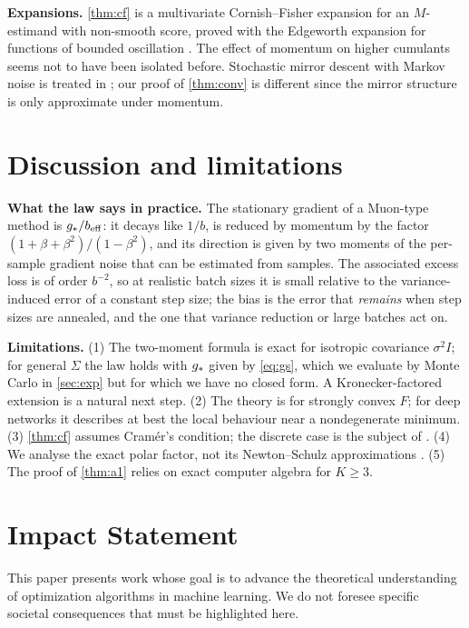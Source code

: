 \documentclass{article}
\theoremstyle{plain}
\theoremstyle{definition}
\theoremstyle{remark}
\begin{document}
\textbf{Expansions.} \cref{thm:cf} is a multivariate Cornish--Fisher expansion \citep{cornish1938moments} for an
$M$-estimand with non-smooth score, proved with the Edgeworth expansion for functions of bounded oscillation
\citep[Thm.~20.1]{br}. The effect of momentum on higher cumulants seems not to have been isolated before.
Stochastic mirror descent with Markov noise is treated in \citet{duchiemd}; our proof of \cref{thm:conv} is different
since the mirror structure is only approximate under momentum.

\section{Discussion and limitations}\label{sec:disc}

\textbf{What the law says in practice.} The stationary gradient of a Muon-type method is $g_\ast/b_{\mathrm{eff}}$: it decays like
$1/b$, is reduced by momentum by the factor $(1+\beta+\beta^2)/(1-\beta^2)$, and its direction is given by two moments
of the per-sample gradient noise that can be estimated from samples. The associated excess loss is of order
$b^{-2}$, so at realistic batch sizes it is small relative to the variance-induced error of a constant step size; the
bias is the error that \emph{remains} when step sizes are annealed, and the one that variance reduction or large
batches act on.

\textbf{Limitations.} (1) The two-moment formula is exact for isotropic covariance $\sigma^2I$; for general $\Sigma$
the law holds with $g_\ast$ given by \eqref{eq:gs}, which we evaluate by Monte Carlo in \cref{sec:exp} but for which we
have no closed form. A Kronecker-factored extension is a natural next step. (2) The theory is for strongly convex
$F$; for deep networks it describes at best the local behaviour near a nondegenerate minimum. (3) \cref{thm:cf} assumes
Cram\'er's condition; the discrete case is the subject of \citet{companionII}. (4) We analyse the exact polar factor,
not its Newton--Schulz approximations \citep{do2026muon,shulgin2026quadratic}. (5) The proof of \cref{thm:a1} relies on exact
computer algebra for $K\ge3$.

\section*{Impact Statement}
This paper presents work whose goal is to advance the theoretical understanding of optimization algorithms in machine
learning. We do not foresee specific societal consequences that must be highlighted here.
\end{document}
